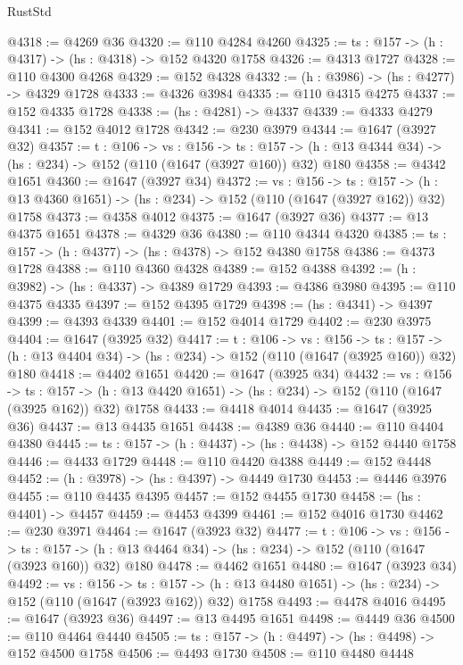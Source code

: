 \begin{lexlean}{RustStd}
\begin{coremodule}
@4318 := @4269 @36
@4320 := @110 @4284 @4260
@4325 := {ts : @157} -> (h : @4317) -> (hs : @4318) -> @152 @4320 @1758
@4326 := @4313 @1727
@4328 := @110 @4300 @4268
@4329 := @152 @4328
@4332 := (h : @3986) -> (hs : @4277) -> @4329 @1728
@4333 := @4326 @3984
@4335 := @110 @4315 @4275
@4337 := @152 @4335 @1728
@4338 := (hs : @4281) -> @4337
@4339 := @4333 @4279
@4341 := @152 @4012 @1728
@4342 := @230 @3979
@4344 := @1647 (@3927 @32)
@4357 := {t : @106} ->
  {vs : @156} ->
  {ts : @157} -> (h : @13 @4344 @34) -> (hs : @234) -> @152 (@110 (@1647 (@3927 @160)) @32) @180
@4358 := @4342 @1651
@4360 := @1647 (@3927 @34)
@4372 := {vs : @156} ->
  {ts : @157} -> (h : @13 @4360 @1651) -> (hs : @234) -> @152 (@110 (@1647 (@3927 @162)) @32) @1758
@4373 := @4358 @4012
@4375 := @1647 (@3927 @36)
@4377 := @13 @4375 @1651
@4378 := @4329 @36
@4380 := @110 @4344 @4320
@4385 := {ts : @157} -> (h : @4377) -> (hs : @4378) -> @152 @4380 @1758
@4386 := @4373 @1728
@4388 := @110 @4360 @4328
@4389 := @152 @4388
@4392 := (h : @3982) -> (hs : @4337) -> @4389 @1729
@4393 := @4386 @3980
@4395 := @110 @4375 @4335
@4397 := @152 @4395 @1729
@4398 := (hs : @4341) -> @4397
@4399 := @4393 @4339
@4401 := @152 @4014 @1729
@4402 := @230 @3975
@4404 := @1647 (@3925 @32)
@4417 := {t : @106} ->
  {vs : @156} ->
  {ts : @157} -> (h : @13 @4404 @34) -> (hs : @234) -> @152 (@110 (@1647 (@3925 @160)) @32) @180
@4418 := @4402 @1651
@4420 := @1647 (@3925 @34)
@4432 := {vs : @156} ->
  {ts : @157} -> (h : @13 @4420 @1651) -> (hs : @234) -> @152 (@110 (@1647 (@3925 @162)) @32) @1758
@4433 := @4418 @4014
@4435 := @1647 (@3925 @36)
@4437 := @13 @4435 @1651
@4438 := @4389 @36
@4440 := @110 @4404 @4380
@4445 := {ts : @157} -> (h : @4437) -> (hs : @4438) -> @152 @4440 @1758
@4446 := @4433 @1729
@4448 := @110 @4420 @4388
@4449 := @152 @4448
@4452 := (h : @3978) -> (hs : @4397) -> @4449 @1730
@4453 := @4446 @3976
@4455 := @110 @4435 @4395
@4457 := @152 @4455 @1730
@4458 := (hs : @4401) -> @4457
@4459 := @4453 @4399
@4461 := @152 @4016 @1730
@4462 := @230 @3971
@4464 := @1647 (@3923 @32)
@4477 := {t : @106} ->
  {vs : @156} ->
  {ts : @157} -> (h : @13 @4464 @34) -> (hs : @234) -> @152 (@110 (@1647 (@3923 @160)) @32) @180
@4478 := @4462 @1651
@4480 := @1647 (@3923 @34)
@4492 := {vs : @156} ->
  {ts : @157} -> (h : @13 @4480 @1651) -> (hs : @234) -> @152 (@110 (@1647 (@3923 @162)) @32) @1758
@4493 := @4478 @4016
@4495 := @1647 (@3923 @36)
@4497 := @13 @4495 @1651
@4498 := @4449 @36
@4500 := @110 @4464 @4440
@4505 := {ts : @157} -> (h : @4497) -> (hs : @4498) -> @152 @4500 @1758
@4506 := @4493 @1730
@4508 := @110 @4480 @4448

\end{coremodule}
\end{lexlean}
